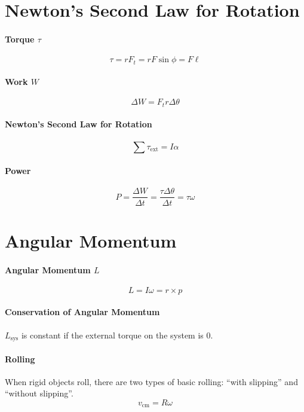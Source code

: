 \documentclass[11pt,letter]{report}
\begin{document}
\section{Newton's Second Law for Rotation}
\paragraph{Torque $\tau$}
$$\tau = rF_t = rF\sin \phi = F\ell$$

\paragraph{Work $W$}
$$\Delta W = F_tr\Delta \theta$$

\paragraph{Newton's Second Law for Rotation}
$$\sum \tau_\text{ext} = I\alpha$$

\paragraph{Power}
$$P = \frac{\Delta W}{\Delta t} = \frac{\tau\Delta\theta}{\Delta t} = \tau\omega$$

\section{Angular Momentum}
\paragraph{Angular Momentum $L$}
$$L = I\omega = r \times p$$

\paragraph{Conservation of Angular Momentum}
$L_\text{sys}$ is constant if the external torque on the system is 0.

\paragraph{Rolling}
When rigid objects roll, there are two types of basic rolling: ``with slipping'' and ``without slipping''. $$v_\text{cm} = R\omega$$
\end{document}
